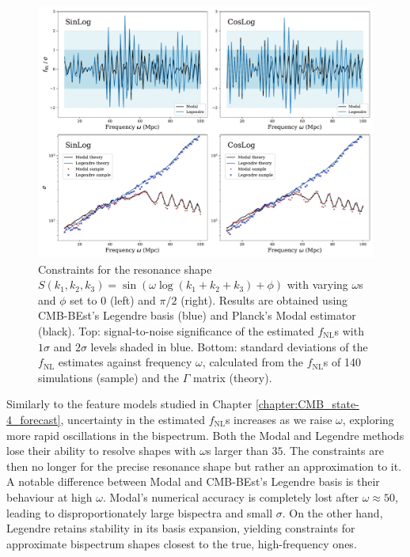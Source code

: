 \begin{figure}[htbp!] 
	\centering    
	\includegraphics[width=\textwidth]{sinlog_template_frequency_Legendre_Modal.pdf}
	\caption{Constraints for the resonance shape $S(k_1,k_2,k_3) = \sin(\omega \log(k_1 + k_2 + k_3 ) + \phi)$ with varying $\omega$s and $\phi$ set to $0$ (left) and $\pi/2$ (right). Results are obtained using CMB-BEst's Legendre basis (blue) and Planck's Modal estimator (black). Top: signal-to-noise significance of the estimated $f_\text{NL}$s with $1\sigma$ and $2\sigma$ levels shaded in blue. Bottom: standard deviations of the $f_\text{NL}$ estimates against frequency $\omega$, calculated from the $f_\text{NL}$s of 140 simulations (sample) and the $\Gamma$ matrix (theory).}
	\label{fig:sinlog_template_frequency_Legendre_Modal}
\end{figure}

Similarly to the feature models studied in Chapter \ref{chapter:CMB_state-4_forecast}, uncertainty in the estimated $f_\text{NL}$s increases as we raise $\omega$, exploring more rapid oscillations in the bispectrum. Both the Modal and Legendre methods lose their ability to resolve shapes with $\omega$s larger than $35$. The constraints are then no longer for the precise resonance shape but rather an approximation to it. A notable difference between Modal and CMB-BEst's Legendre basis is their behaviour at high $\omega$. Modal's numerical accuracy is completely lost after $\omega\approx 50$, leading to disproportionately large bispectra and small $\sigma$. On the other hand, Legendre retains stability in its basis expansion, yielding constraints for approximate bispectrum shapes closest to the true, high-frequency ones.

